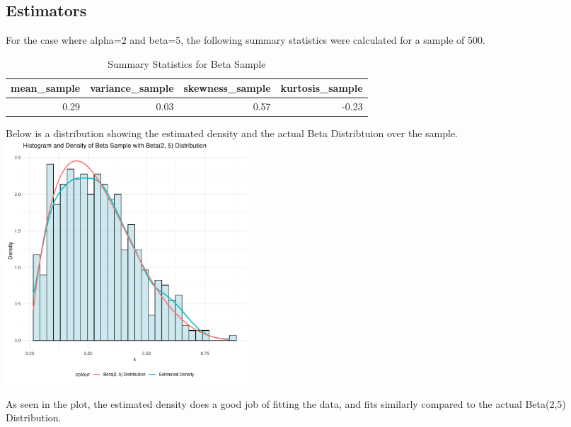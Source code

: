 \documentclass{article}\usepackage[]{graphicx}\usepackage[]{xcolor}
\newenvironment{knitrout}{}{} %
\begin{document}
\begin{multicols}{2}
\section{Estimators}
For the case where alpha=2 and beta=5, the following summary statistics were calculated for a sample of 500.



\begin{table}[H]
\centering
\begingroup\small
\begin{tabular}{rrrr}
  \hline
mean\_sample & variance\_sample & skewness\_sample & kurtosis\_sample \\ 
  \hline
0.29 & 0.03 & 0.57 & -0.23 \\ 
   \hline
\end{tabular}
\endgroup
\caption{Summary Statistics for Beta Sample} 
\end{table}


Below is a distribution showing the estimated density and the actual Beta Distribtuion over the sample.
\begin{knitrout}
\color{fgcolor}
\includegraphics[width=0.4\textwidth,height=0.2\textheight]{figure/plot_beta_sample-1} 
\end{knitrout}

As seen in the plot, the estimated density does a good job of fitting the data, and fits similarly compared to the actual Beta(2,5) Distribution.


\end{multicols}
\end{document}
